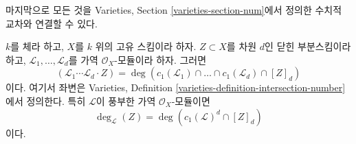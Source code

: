 \noindent
마지막으로 모든 것을 Varieties, Section
\ref{varieties-section-num}에서 정의한 수치적 교차와 연결할 수 있다.

\begin{lemma}
\label{lemma-degrees-and-numerical-intersections}
$k$를 체라 하고, $X$를 $k$ 위의 고유 스킴이라 하자.
$Z \subset X$를 차원 $d$인 닫힌 부분스킴이라 하고,
$\mathcal{L}_1, \ldots, \mathcal{L}_d$를 가역
$\mathcal{O}_X$-모듈이라 하자. 그러면
$$
(\mathcal{L}_1 \cdots \mathcal{L}_d \cdot Z) =
\deg(
c_1(\mathcal{L}_1) \cap \ldots \cap c_1(\mathcal{L}_d) \cap [Z]_d)
$$
이다. 여기서 좌변은 Varieties, Definition
\ref{varieties-definition-intersection-number}에서 정의한다. 특히
$\mathcal{L}$이 풍부한 가역 $\mathcal{O}_X$-모듈이면
$$
\deg_\mathcal{L}(Z) = \deg(c_1(\mathcal{L})^d \cap [Z]_d)
$$
이다.
\end{lemma}

